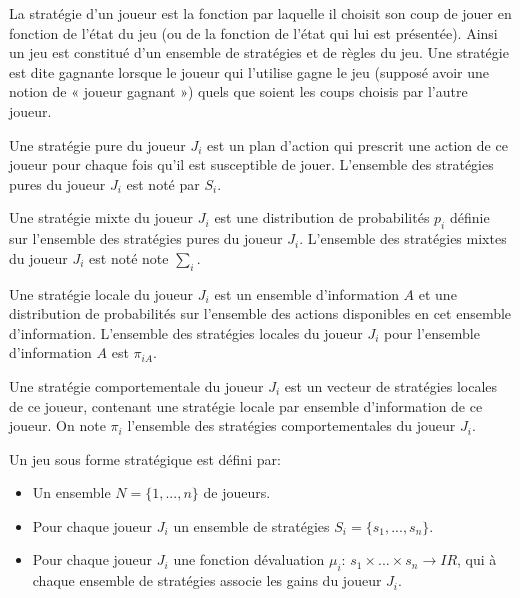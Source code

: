 \begin{definition}[Stratégie]
	La stratégie d’un joueur est la fonction par laquelle il choisit son coup de jouer en fonction de l’état du jeu (ou de la fonction de l’état qui lui est présentée). Ainsi un jeu est constitué d'un ensemble de stratégies et de règles du jeu.  Une stratégie est dite gagnante lorsque le joueur qui l’utilise gagne le jeu (supposé avoir une notion de « joueur gagnant ») quels que soient les coups choisis par l’autre joueur.	
\end{definition}

\begin{definition}
	Une stratégie pure du joueur $J_i$ est un plan d’action qui prescrit une action de ce joueur pour chaque fois qu’il est susceptible de jouer. L’ensemble des stratégies pures du joueur $J_i$ est noté par $S_i$.
\end{definition}

\begin{definition}
	Une stratégie mixte du joueur $J_i$ est une distribution de probabilités $p_i$ définie sur l’ensemble des stratégies pures du joueur $J_i$. L’ensemble des stratégies mixtes du joueur $J_i$  est noté note $\sum_i$.
\end{definition}

\begin{definition}
	Une stratégie locale du joueur $J_i$ est un ensemble d’information $A$ et une distribution de probabilités sur l’ensemble des actions disponibles en cet ensemble d’information. L’ensemble des stratégies locales du joueur $J_i$ pour l’ensemble d’information $A$  est $\pi_{iA}$.
\end{definition}

\begin{definition}
	Une stratégie comportementale du joueur $J_i$ est un vecteur de stratégies locales de ce joueur, contenant une stratégie locale par ensemble d’information de ce joueur. On note $\pi_i$ l’ensemble des stratégies comportementales du joueur $J_i$.
\end{definition}

\begin{definition}
	Un jeu sous forme stratégique est défini par:
	\begin{itemize}
		\item Un ensemble $N = \{1, . . ., n\}$ de joueurs.
		\item Pour chaque joueur $J_i$ un ensemble de stratégies $ S_i = \{s_1, . . ., s_n\}$.
		\item Pour chaque joueur  $J_i$ une fonction dévaluation $\mu_i$: $s_1 \times . . . \times s_n \longrightarrow IR$, qui à chaque ensemble de stratégies associe les gains du joueur $J_i$.
	\end{itemize}
\end{definition}

